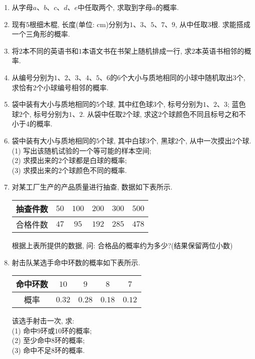 \documentclass[10pt,a4paper]{article}
\begin{document}
\begin{enumerate}[1.]
\item 从字母$a$、$b$、$c$、$d$、$e$中任取两个, 求取到字母$a$的概率.
\item 现有$5$根细木棍, 长度(单位: $\text{cm}$)分别为$1$、$3$、$5$、$7$、$9$, 从中任取$3$根. 求能搭成一个三角形的概率.
\item 将$2$本不同的英语书和$1$本语文书在书架上随机排成一行, 求$2$本英语书相邻的概率. 
\item 从编号分别为$1$、$2$、$3$、$4$、$5$、$6$的$6$个大小与质地相同的小球中随机取出$3$个, 求恰有$2$个小球编号相邻的概率.
\item 袋中装有大小与质地相同的$5$个球, 其中红色球$3$个, 标号分别为$1$、$2$、$3$; 蓝色球$2$个, 标号分别为$1$、$2$. 从袋中任取$2$个球, 求这$2$个球颜色不同且标号之和不小于$4$的概率.
\item 袋中装有大小与质地相同的$5$个球, 其中白球$3$个, 黑球$2$个, 从中一次摸出$2$个球.\\
(1) 写出该随机试验的一个等可能的样本空间;\\
(2) 求摸出来的$2$个球都是白球的概率;\\
(3) 求摸出来的$2$个球颜色不同的概率.
\item 对某工厂生产的产品质量进行抽查, 数据如下表所示.
\begin{center}
    \begin{tabular}{|c|c|c|c|c|c|}
        \hline
        抽查件数 & $50$ & $100$ & $200$ & $300$ & $500$\\ \hline
        合格件数 & $47$ & $95$ & $192$ & $285$ & $478$\\ \hline        
    \end{tabular}
\end{center}
根据上表所提供的数据, 问: 合格品的概率约为多少?(结果保留两位小数)
\item 射击队某选手命中环数的概率如下表所示.
\begin{center}
    \begin{tabular}{|c|c|c|c|c|}
        \hline
        命中环数 & $10$ & $9$ & $8$ & $7$\\ \hline
        概率 & $0.32$ & $0.28$ & $0.18$ & $0.12$ \\ \hline        
    \end{tabular}
\end{center}
该选手射击一次, 求:\\
(1) 命中$9$环或$10$环的概率;\\
(2) 至少命中$8$环的概率;\\
(3) 命中不足$8$环的概率. 
\end{enumerate}
\end{document}
